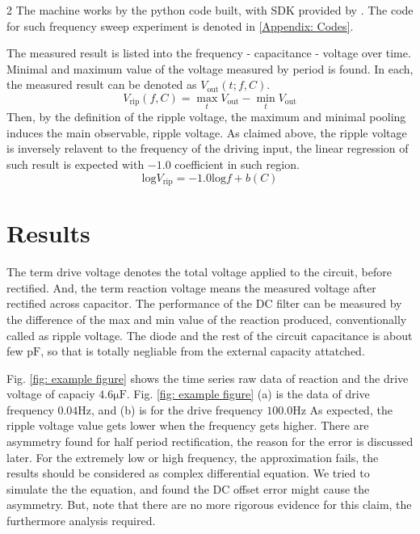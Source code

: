 \documentclass{article}
\begin{document}
\begin{multicols}{2}
 The machine works by the python code built, with SDK provided by \cite{digilent_analog_discovery}.
 The code for such frequency sweep experiment is denoted in \ref{Appendix: Codes}.

 The measured result is listed into the frequency - capacitance - voltage over time.
 Minimal and maximum value of the voltage measured by period is found.
 In each, the measured result can be denoted as $V_{\mathrm{out}} (t; f, C) $.
 \begin{equation}
    V_{\mathrm{rip}} (f, C) = \max_t V_{\mathrm{out}} - \min_t V_{\mathrm{out}}
 \end{equation}
 Then, by the definition of the ripple voltage, the maximum and minimal pooling induces the main observable, ripple voltage.
 As claimed above, the ripple voltage is inversely relavent to the frequency of the driving input, the linear regression of such result is expected with $-1.0$ coefficient in such region.
 \begin{equation}
    \mathrm{log} V_{\mathrm{rip}} = -1.0 \mathrm{log} f + b(C)
 \end{equation}

\section{Results}
 The term drive voltage denotes the total voltage applied to the circuit, before rectified.
 And, the term reaction voltage means the measured voltage after rectified across capacitor.
 The performance of the DC filter can be measured by the difference of the max and min value of the reaction produced, conventionally called as ripple voltage.
 The diode and the rest of the circuit capacitance is about few $\mathrm{pF}$, so that is totally negliable from the external capacity attatched.
 
Fig. \ref{fig: example figure} shows the time series raw data of reaction and the drive voltage of capaciy $4.6 \mathrm{\mu F}$.
Fig. \ref{fig: example figure} (a) is the data of drive frequency $0.04 \mathrm{Hz}$, and (b) is for the drive frequency $100.0 \mathrm{Hz}$
As expected, the ripple voltage value gets lower when the frequency gets higher.
There are asymmetry found for half period rectification, the reason for the error is discussed later.
For the extremely low or high frequency, the approximation fails, the results should be considered as complex differential equation.
We tried to simulate the the equation, and found the DC offset error might cause the asymmetry.
But, note that there are no more rigorous evidence for this claim, the furthermore analysis required.


\end{multicols}
\end{document}
